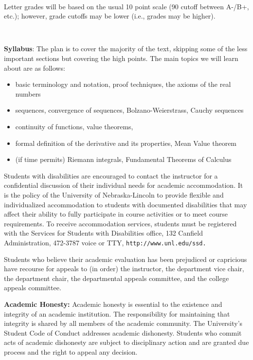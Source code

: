 \documentclass{amsart}
\begin{document}
\


\noindent Letter grades will be based on the usual 10 point scale (90 cutoff between A-/B+, etc.); however, grade cutoffs may be lower (i.e., grades may be higher).

\

\noindent
{\bf Syllabus}: The plan is to cover the majority of the text, skipping some of the less important sections but covering the high points.
The main topics we will learn about are as follows:
\begin{itemize}
  \item 
    basic terminology and  notation, proof techniques, the axioms of the real numbers
    \item sequences, convergence of sequences, Bolzano-Weierstrass, Cauchy sequences
      \item continuity of functions,  value theorems,
\item formal definition of the derivative and its properties, Mean Value theorem
  \item (if time permits) Riemann integrals, Fundamental Theorems of Calculus \\ 
  \end{itemize}

\bigskip

 Students with disabilities are encouraged to contact the instructor for a confidential discussion of their
individual needs for academic accommodation. It is the policy of the University of Nebraska-Lincoln to provide flexible and individualized accommodation to
students with documented disabilities that may affect their ability to fully participate in course activities or to meet course requirements. To receive
accommodation services, students must be registered with the Services for Students with Disabilities office, 132 Canfield Administration, 472-3787 voice or TTY,
{\tt http://www.unl.edu/ssd.}

\bigskip
{} Students who believe their academic evaluation has been prejudiced or capricious have recourse for appeals to (in
order) the instructor, the department vice chair, the department chair, the departmental appeals committee, and the college appeals committee. 



\bigskip
\noindent
{\bf Academic Honesty:}
Academic honesty is essential to the existence and integrity of an academic institution. The responsibility for maintaining that integrity is shared by all members of the academic community. The University's Student Code of Conduct addresses academic dishonesty. Students who commit acts of academic dishonesty are subject to disciplinary action and are granted due process and the right to appeal any decision.
\end{document}
